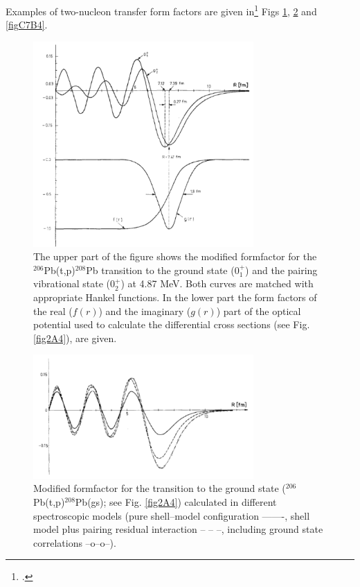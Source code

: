  Examples of two-nucleon transfer form factors are given in\footnote{\cite{Broglia:67}.} Figs \ref{figC7B2}, \ref{figC7B3} and \ref{figC7B4}.
 \begin{figure}[h!]
 	\begin{center}
\includegraphics*[width=0.75\textwidth]{C7/figs_C7/figC7B2}
\end{center}\caption{The upper part of the figure shows the modified formfactor for the $^{206}$Pb(t,p)$^{208}$Pb transition to the ground state ($0^+_1$) and the pairing vibrational state ($0^+_2$) at 4.87 MeV. Both curves are matched with appropriate 	Hankel functions. In the lower part the form factors of the real ($f(r)$) and the imaginary ($g(r)$) part of the optical potential used to calculate the differential cross sections (see Fig. \ref{fig2A4}), are given.}\label{figC7B2}
\end{figure}
 \begin{figure}[h!]
 	\begin{center}
\includegraphics*[width=0.75\textwidth]{C7/figs_C7/figC7B3}
\end{center}\caption{Modified formfactor for the transition to the ground state ($^{206}$Pb(t,p)$^{208}$Pb(gs); see Fig. \ref{fig2A4}) calculated in different spectroscopic models (pure shell--model configuration -------, shell model  plus pairing residual interaction -- -- --, including ground state correlations --o--o--).}\label{figC7B3}
\end{figure}
